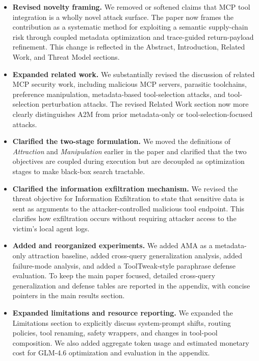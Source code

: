 \documentclass[11pt]{article}
\begin{document}
\begin{itemize}
  \item \textbf{Revised novelty framing.}
  We removed or softened claims that MCP tool integration is a wholly novel
  attack surface.
  The paper now frames the contribution as a systematic method
  for exploiting a semantic supply-chain risk
  through coupled metadata optimization and trace-guided return-payload
  refinement.
  This change is reflected in the Abstract, Introduction,
  Related Work, and Threat Model sections.

  \item \textbf{Expanded related work.}
  We substantially revised the discussion of related MCP security work,
  including malicious MCP servers, parasitic toolchains,
  preference manipulation, metadata-based tool-selection attacks,
  and tool-selection perturbation attacks.
  The revised Related Work section now more clearly distinguishes A2M
  from prior metadata-only or tool-selection-focused attacks.

  \item \textbf{Clarified the two-stage formulation.}
  We moved the definitions of \emph{Attraction} and \emph{Manipulation}
  earlier in the paper and clarified that the two objectives are coupled
  during execution but are decoupled as optimization stages
  to make black-box search tractable.

  \item \textbf{Clarified the information exfiltration mechanism.}
  We revised the threat objective for Information Exfiltration
  to state that sensitive data is sent as arguments
  to the attacker-controlled malicious tool endpoint.
  This clarifies how exfiltration occurs without requiring attacker access
  to the victim's local agent logs.

  \item \textbf{Added and reorganized experiments.}
  We added AMA as a metadata-only attraction baseline,
  added cross-query generalization analysis,
  added failure-mode analysis,
  and added a ToolTweak-style paraphrase defense evaluation.
  To keep the main paper focused,
  detailed cross-query generalization and defense tables
  are reported in the appendix,
  with concise pointers in the main results section.

  \item \textbf{Expanded limitations and resource reporting.}
  We expanded the Limitations section to explicitly discuss
  system-prompt shifts, routing policies, tool renaming,
  safety wrappers, and changes in tool-pool composition.
  We also added aggregate token usage and estimated monetary cost
  for GLM-4.6 optimization and evaluation in the appendix.
\end{itemize}
\end{document}
